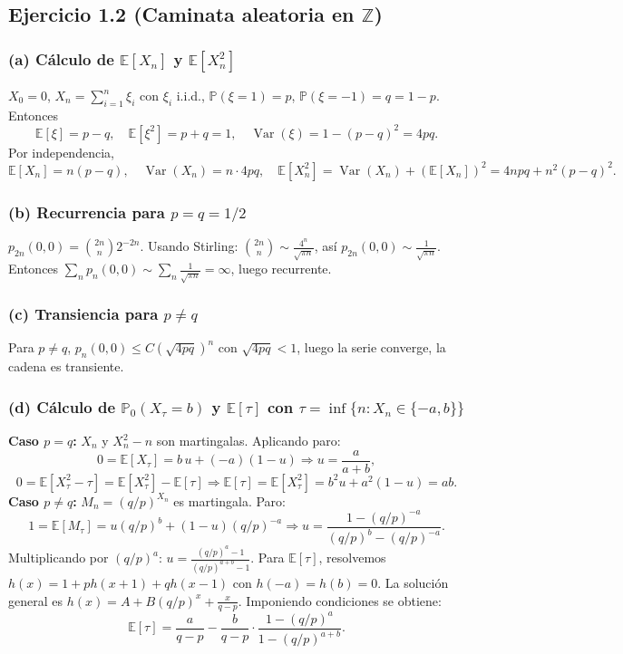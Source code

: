 \documentclass[letterpaper, 12pt]{article}
\newcommand{\E}{\mathbb{E}}
\renewcommand{\P}{\mathbb{P}}
\newcommand{\Z}{\mathbb{Z}}
\newcommand{\1}{\mathbbm{1}}
\DeclareMathOperator{\Var}{Var}
\begin{document}
    \subsection{Ejercicio 1.2 (Caminata aleatoria en $\Z$)}

    \subsubsection*{(a) C\'alculo de $\E[X_n]$ y $\E[X_n^2]$}
    $X_0=0$, $X_n=\sum_{i=1}^n\xi_i$ con $\xi_i$ i.i.d., $\P(\xi=1)=p$, $\P(\xi=-1)=q=1-p$. Entonces
    \[
    \E[\xi]=p-q,\quad \E[\xi^2]=p+q=1,\quad \Var(\xi)=1-(p-q)^2=4pq.
    \]
    Por independencia,
    \[
    \E[X_n]=n(p-q),\quad \Var(X_n)=n\cdot4pq,\quad \E[X_n^2]=\Var(X_n)+(\E[X_n])^2=4npq+n^2(p-q)^2.
    \]

    \subsubsection*{(b) Recurrencia para $p=q=1/2$}
    $p_{2n}(0,0)=\binom{2n}{n}2^{-2n}$. Usando Stirling: $\binom{2n}{n}\sim\frac{4^n}{\sqrt{\pi n}}$, as\'i $p_{2n}(0,0)\sim\frac1{\sqrt{\pi n}}$. Entonces $\sum_n p_n(0,0)\sim\sum_n\frac1{\sqrt{\pi n}}=\infty$, luego recurrente.
    \newpage
    \subsubsection*{(c) Transiencia para $p\neq q$}
    Para $p\neq q$, $p_n(0,0)\le C(\sqrt{4pq})^n$ con $\sqrt{4pq}<1$, luego la serie converge, la cadena es transiente.

    \subsubsection*{(d) C\'alculo de $\P_0(X_\tau=b)$ y $\E[\tau]$ con $\tau=\inf\{n:X_n\in\{-a,b\}\}$}
    \textbf{Caso $p=q$:} $X_n$ y $X_n^2-n$ son martingalas. Aplicando paro:
    \[
    0=\E[X_\tau]=b\,u+(-a)(1-u)\Rightarrow u=\frac{a}{a+b},
    \]
    \[
    0=\E[X_\tau^2-\tau]=\E[X_\tau^2]-\E[\tau]\Rightarrow \E[\tau]=\E[X_\tau^2]=b^2u+a^2(1-u)=ab.
    \]
    \textbf{Caso $p\neq q$:} $M_n=(q/p)^{X_n}$ es martingala. Paro:
    \[
    1=\E[M_\tau]=u(q/p)^b+(1-u)(q/p)^{-a}\Rightarrow u=\frac{1-(q/p)^{-a}}{(q/p)^b-(q/p)^{-a}}.
    \]
    Multiplicando por $(q/p)^a$: $u=\frac{(q/p)^a-1}{(q/p)^{a+b}-1}$. Para $\E[\tau]$, resolvemos $h(x)=1+ph(x+1)+qh(x-1)$ con $h(-a)=h(b)=0$. La soluci\'on general es $h(x)=A+B(q/p)^x+\frac{x}{q-p}$. Imponiendo condiciones se obtiene:
    \[
    \E[\tau]=\frac{a}{q-p}-\frac{b}{q-p}\cdot\frac{1-(q/p)^a}{1-(q/p)^{a+b}}.
    \]
\end{document}
